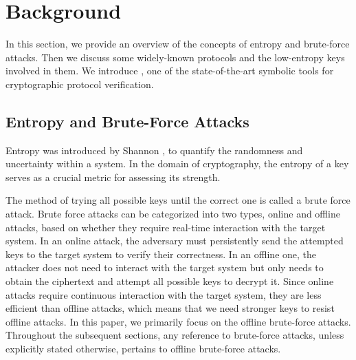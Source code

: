 \documentclass[../main.tex]{subfiles}
\begin{document}
\section{Background} \label{sec:2background}

In this section, we provide an overview of the concepts of entropy and brute-force attacks.
Then we discuss some widely-known protocols and the low-entropy keys involved in them.
We introduce \Tamarin{}\cite{meier2013tamarin}, one of the state-of-the-art symbolic tools for cryptographic protocol verification.

\subsection{Entropy and Brute-Force Attacks}

Entropy was introduced by Shannon \cite{shannon1948communicationtheory}, to quantify the randomness and uncertainty within a system.
In the domain of cryptography, the entropy of a key serves as a crucial metric for assessing its strength.

The method of trying all possible keys until the correct one is called a brute force attack.
Brute force attacks can be categorized into two types, online and offline attacks, based on whether they require real-time interaction with the target system.
In an online attack, the adversary must persistently send the attempted keys to the target system to verify their correctness.
In an offline one, the attacker does not need to interact with the target system but only needs to obtain the ciphertext and attempt all possible keys to decrypt it.
Since online attacks require continuous interaction with the target system, they are less efficient than offline attacks, which means that we need stronger keys to resist offline attacks.
In this paper, we primarily focus on the offline brute-force attacks.
Throughout the subsequent sections, any reference to brute-force attacks, unless explicitly stated otherwise, pertains to offline brute-force attacks.
\end{document}

